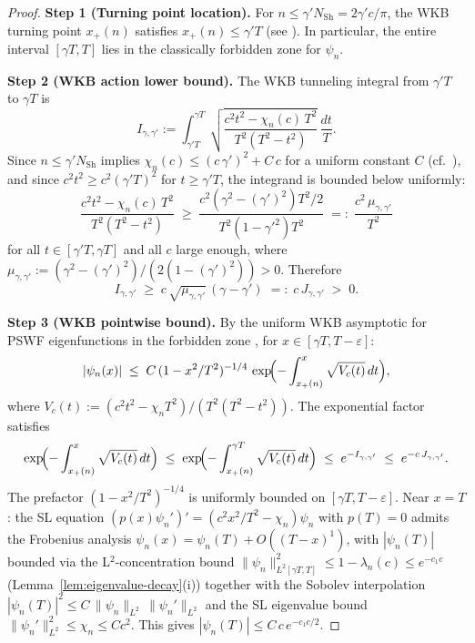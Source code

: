 \begin{proof}
\textbf{Step 1 (Turning point location).}
For $n \le \gamma' N_{\mathrm{Sh}} = 2\gamma' c/\pi$,
the WKB turning point $x_+(n)$ satisfies
$x_+(n) \le \gamma' T$ (see
\cite[§4.4, eq.~(4.85)]{OsipovRokhlinXiao}).
In particular, the entire interval $[\gamma T, T]$ lies in the
classically forbidden zone for $\psi_n$.

\textbf{Step 2 (WKB action lower bound).}
The WKB tunneling integral from $\gamma' T$ to $\gamma T$ is
\begin{equation}
\label{eq:bridge:I}
  I_{\gamma,\gamma'}
  := \int_{\gamma' T}^{\gamma T}
     \sqrt{\frac{c^2 t^2 - \chi_n(c)\,T^2}{T^2(T^2 - t^2)}}\,
     \frac{dt}{T}.
\end{equation}
Since $n \le \gamma' N_{\mathrm{Sh}}$ implies
$\chi_n(c) \le (c\,\gamma')^2 + C\,c$ for a uniform constant $C$
(cf.\ \cite[Theorem~2.7]{OsipovRokhlinXiao}), and since
$c^2 t^2 \ge c^2 (\gamma' T)^2$ for $t \ge \gamma' T$,
the integrand is bounded below uniformly:
\begin{equation}
\label{eq:bridge:integrand-lb}
  \frac{c^2 t^2 - \chi_n(c)\,T^2}{T^2(T^2 - t^2)}
  \;\ge\;
  \frac{c^2(\gamma^2 - (\gamma')^2)T^2/2}{T^2(1-\gamma'^2)T^2}
  \;=:\;
  \frac{c^2\,\mu_{\gamma,\gamma'}}{T^2}
\end{equation}
for all $t \in [\gamma'T, \gamma T]$ and all $c$ large enough,
where $\mu_{\gamma,\gamma'} := (\gamma^2-(\gamma')^2)/(2(1-(\gamma')^2)) > 0$.
Therefore
\begin{equation}
\label{eq:bridge:I-lower}
  I_{\gamma,\gamma'}
  \;\ge\;
  c\,\sqrt{\mu_{\gamma,\gamma'}}\,(\gamma - \gamma')
  \;=:\;
  c\,J_{\gamma,\gamma'}\;>\; 0.
\end{equation}

\textbf{Step 3 (WKB pointwise bound).}
By the uniform WKB asymptotic for PSWF eigenfunctions in the
forbidden zone
\cite[Theorem~4.6, eq.~(4.131)]{OsipovRokhlinXiao},
for $x \in [\gamma T, T - \varepsilon]$:
\[
  |\psi_n(x)| \;\le\;
  C\,(1 - x^2/T^2)^{-1/4}\,
  \exp\!\Bigl(-\int_{x_+(n)}^{x}
    \sqrt{V_c(t)}\,dt\Bigr),
\]
where $V_c(t) := (c^2t^2 - \chi_n T^2)/(T^2(T^2 - t^2))$.
The exponential factor satisfies
\[
  \exp\!\Bigl(-\int_{x_+(n)}^{x}\sqrt{V_c(t)}\,dt\Bigr)
  \;\le\;
  \exp\!\Bigl(-\int_{x_+(n)}^{\gamma T}\sqrt{V_c(t)}\,dt\Bigr)
  \;\le\;
  e^{-I_{\gamma,\gamma'}}
  \;\le\;
  e^{-c\,J_{\gamma,\gamma'}}.
\]
The prefactor $(1 - x^2/T^2)^{-1/4}$ is uniformly bounded on
$[\gamma T, T - \varepsilon]$.
Near $x = T$: the SL equation $(p(x)\psi_n')'
= (c^2x^2/T^2 - \chi_n)\psi_n$ with $p(T) = 0$ admits the
Frobenius analysis $\psi_n(x) = \psi_n(T) + O((T-x)^1)$,
with $|\psi_n(T)|$ bounded via the L$^2$-concentration bound
$\|\psi_n\|_{L^2[\gamma T, T]}^2 \le 1 - \lambda_n(c) \le e^{-c_1 c}$
(Lemma~\ref{lem:eigenvalue-decay}(i)) together with the Sobolev
interpolation
$|\psi_n(T)|^2 \le C\,\|\psi_n\|_{L^2}\,\|\psi_n'\|_{L^2}$
and the SL eigenvalue bound
$\|\psi_n'\|_{L^2}^2 \le \chi_n \le Cc^2$.
This gives $|\psi_n(T)| \le C\,c\,e^{-c_1 c/2}$.


\end{proof}
